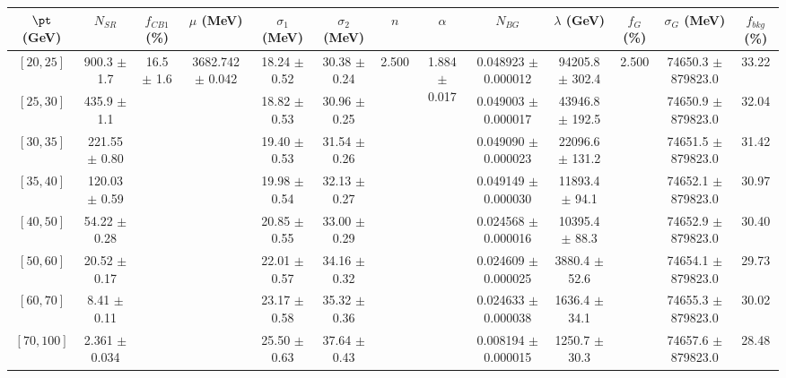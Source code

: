 \begin{tabular}{c||c|c|c|c|c|c|c|c|c|c|c||c}
$\pt$ (GeV) & $N_{SR}$ & $f_{CB1}$ (\%) & $\mu$ (MeV) & $\sigma_1$ (MeV) & $\sigma_2$ (MeV) & $n$ & $\alpha$ & $N_{BG}$ & $\lambda$ (GeV) & $f_G$ (\%) & $\sigma_G$ (MeV) & $f_{bkg}$ (\%) \\
\hline
$[20, 25]$ & 900.3 $\pm$ 1.7 & \multirow{8}{*}{16.5 $\pm$ 1.6} & \multirow{8}{*}{3682.742 $\pm$ 0.042} & 18.24 $\pm$ 0.52 & 30.38 $\pm$ 0.24 & \multirow{8}{*}{2.500} & \multirow{8}{*}{1.884 $\pm$ 0.017} & 0.048923 $\pm$ 0.000012 & 94205.8 $\pm$ 302.4 & \multirow{8}{*}{2.500} & 74650.3 $\pm$ 879823.0 & 33.22\\
$[25, 30]$ & 435.9 $\pm$ 1.1 &  &  & 18.82 $\pm$ 0.53 & 30.96 $\pm$ 0.25 &  &  & 0.049003 $\pm$ 0.000017 & 43946.8 $\pm$ 192.5 &  & 74650.9 $\pm$ 879823.0 & 32.04\\
$[30, 35]$ & 221.55 $\pm$ 0.80 &  &  & 19.40 $\pm$ 0.53 & 31.54 $\pm$ 0.26 &  &  & 0.049090 $\pm$ 0.000023 & 22096.6 $\pm$ 131.2 &  & 74651.5 $\pm$ 879823.0 & 31.42\\
$[35, 40]$ & 120.03 $\pm$ 0.59 &  &  & 19.98 $\pm$ 0.54 & 32.13 $\pm$ 0.27 &  &  & 0.049149 $\pm$ 0.000030 & 11893.4 $\pm$ 94.1 &  & 74652.1 $\pm$ 879823.0 & 30.97\\
$[40, 50]$ & 54.22 $\pm$ 0.28 &  &  & 20.85 $\pm$ 0.55 & 33.00 $\pm$ 0.29 &  &  & 0.024568 $\pm$ 0.000016 & 10395.4 $\pm$ 88.3 &  & 74652.9 $\pm$ 879823.0 & 30.40\\
$[50, 60]$ & 20.52 $\pm$ 0.17 &  &  & 22.01 $\pm$ 0.57 & 34.16 $\pm$ 0.32 &  &  & 0.024609 $\pm$ 0.000025 & 3880.4 $\pm$ 52.6 &  & 74654.1 $\pm$ 879823.0 & 29.73\\
$[60, 70]$ & 8.41 $\pm$ 0.11 &  &  & 23.17 $\pm$ 0.58 & 35.32 $\pm$ 0.36 &  &  & 0.024633 $\pm$ 0.000038 & 1636.4 $\pm$ 34.1 &  & 74655.3 $\pm$ 879823.0 & 30.02\\
$[70, 100]$ & 2.361 $\pm$ 0.034 &  &  & 25.50 $\pm$ 0.63 & 37.64 $\pm$ 0.43 &  &  & 0.008194 $\pm$ 0.000015 & 1250.7 $\pm$ 30.3 &  & 74657.6 $\pm$ 879823.0 & 28.48\\
\end{tabular}
